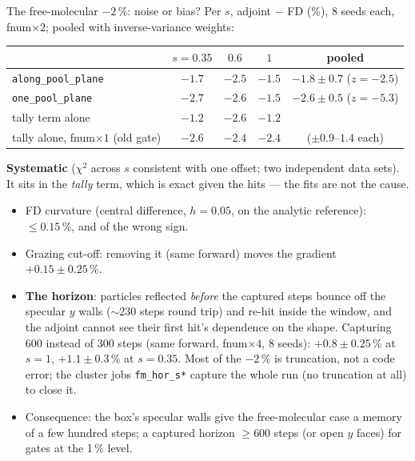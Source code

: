 \documentclass[10pt,aspectratio=169]{beamer}
\newcommand{\code}[1]{\texttt{\small #1}}
\begin{document}
\begin{frame}{The free-molecular $-2\,\%$: noise or bias?}
\footnotesize
Per $s$, adjoint $-$ FD (\%), 8 seeds each, fnum$\times2$; pooled with inverse-variance weights:

\medskip
\centering
\begin{tabular}{@{}lcccc@{}}
\toprule
 & $s = 0.35$ & $0.6$ & $1$ & pooled \\
\midrule
\code{along\_pool\_plane} & $-1.7$ & $-2.5$ & $-1.5$ & $-1.8\pm0.7$ ($z=-2.5$)\\
\code{one\_pool\_plane} & $-2.7$ & $-2.6$ & $-1.5$ & $-2.6\pm0.5$ ($z=-5.3$)\\
tally term alone & $-1.2$ & $-2.6$ & $-1.2$ & \\
tally alone, fnum$\times1$ (old gate) & $-2.6$ & $-2.4$ & $-2.4$ & ($\pm0.9$--$1.4$ each)\\
\bottomrule
\end{tabular}

\raggedright
\medskip
\textbf{Systematic} ($\chi^2$ across $s$ consistent with one offset; two independent data sets).
It sits in the \emph{tally} term, which is exact given the hits --- the fits are not the cause.
\begin{itemize}
\item FD curvature (central difference, $h = 0.05$, on the analytic reference): $\le0.15\,\%$, and of
  the wrong sign.
\item Grazing cut-off: removing it (same forward) moves the gradient $+0.15\pm0.25\,\%$.
\item \textbf{The horizon}: particles reflected \emph{before} the captured steps bounce off the
  specular $y$ walls ($\sim$230 steps round trip) and re-hit inside the window, and the adjoint
  cannot see their first hit's dependence on the shape.  Capturing 600 instead of 300 steps
  (same forward, fnum$\times4$, 8 seeds): $+0.8\pm0.25\,\%$ at $s = 1$, $+1.1\pm0.3\,\%$ at
  $s = 0.35$.  Most of the $-2\,\%$ is truncation, not a code error; the cluster jobs
  \code{fm\_hor\_s*} capture the whole run (no truncation at all) to close it.
\item Consequence: the box's specular walls give the free-molecular case a memory of a few
  hundred steps; a captured horizon $\ge 600$ steps (or open $y$ faces) for gates at the 1\,\% level.
\end{itemize}
\end{frame}
\end{document}
